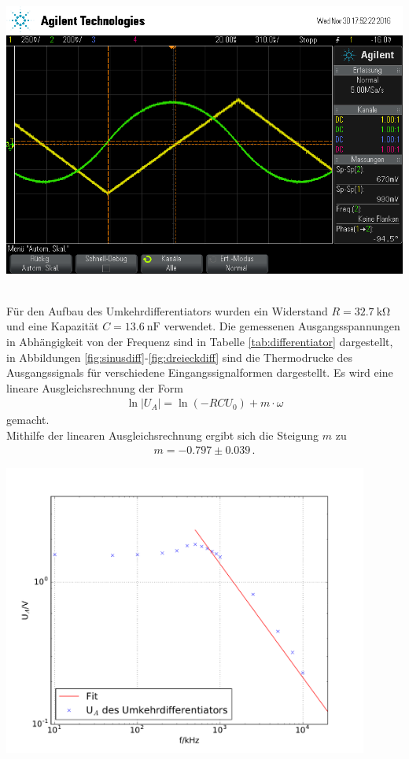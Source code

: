 \documentclass[]{scrartcl}
\begin{document}
\begin{minipage}[t]{0.5\textwidth}
	\includegraphics[width=\textwidth]{images/dreieck_int}
	\label{fig:dreieckint}
\end{minipage} \\
Für den Aufbau des Umkehrdifferentiators wurden ein Widerstand $R=\SI{32.7}{\kilo\ohm}$ und eine Kapazität $C=\SI{13.6}{\nano\farad}$ verwendet. Die gemessenen Ausgangsspannungen in Abhängigkeit von der Frequenz sind in Tabelle \ref{tab:differentiator} dargestellt, in Abbildungen \ref{fig:sinusdiff}-\ref{fig:dreieckdiff} sind die Thermodrucke des Ausgangssignals für verschiedene Eingangssignalformen dargestellt.
Es wird eine lineare Ausgleichsrechnung der Form 
\begin{align}
\ln |U_A| = \ln\left(-RCU_0\right)+m\cdot\omega
\end{align}
gemacht. \\
Mithilfe der linearen Ausgleichsrechnung ergibt sich die Steigung $m$ zu
\begin{align*}
m = -0.797 \pm 0.039\,.
\end{align*}
\begin{center}
	\includegraphics[width=12cm]{images/differentiator.pdf}
	\label{fig:differentiator}
\end{center}
\end{document}
